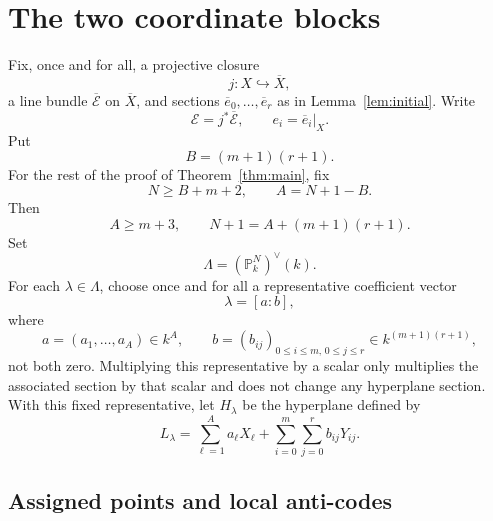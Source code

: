 \documentclass{lms}
\newcommand{\PP}{\mathbb P}
\newcommand{\EE}{\mathcal E}
\newcommand{\barX}{\overline{X}}
\begin{document}
\section{The two coordinate blocks}\label{sec:blocks}

Fix, once and for all, a projective closure
\[
        j:X\hookrightarrow\barX,
\]
a line bundle $\overline{\EE}$ on $\barX$, and sections $\overline e_0,\ldots,\overline e_r$ as in Lemma~\ref{lem:initial}.  Write
\[
        \EE=j^*\overline{\EE},
        \qquad
        e_i=\overline e_i|_X .
\]
Put
\[
        B=(m+1)(r+1).
\]
For the rest of the proof of Theorem~\ref{thm:main}, fix
\[
        N\ge B+m+2,
        \qquad
        A=N+1-B.
\]
Then
\[
        A\ge m+3,
        \qquad
        N+1=A+(m+1)(r+1).
\]
Set
\[
        \Lambda=(\PP^N_k)^\vee(k).
\]
For each $\lambda\in\Lambda$, choose once and for all a representative coefficient vector
\[
        \lambda=[a:b],
\]
where
\[
        a=(a_1,\ldots,a_A)\in k^A,
        \qquad
        b=(b_{ij})_{0\le i\le m,\,0\le j\le r}
        \in k^{(m+1)(r+1)},
\]
not both zero.  Multiplying this representative by a scalar only multiplies the associated section by that scalar and does not change any hyperplane section.  With this fixed representative, let $H_\lambda$ be the hyperplane defined by
\[
        L_\lambda=
        \sum_{\ell=1}^{A}a_\ell X_\ell+
        \sum_{i=0}^{m}\sum_{j=0}^{r}b_{ij}Y_{ij}.
\]

\subsection{Assigned points and local anti-codes}
\end{document}
